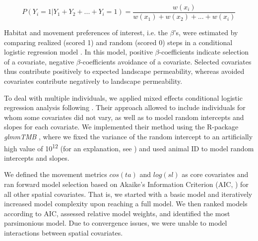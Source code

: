 \documentclass[abstract=on,10pt,a4paper,bibliography=totocnumbered]{scrartcl}
\begin{document}
\begin{equation}
\label{EQ3}
  P(Y_{i} = 1 | Y_{1} + Y_{2} + ... + Y_{i} = 1) =
  \frac{w(x_{i})}{w(x_{1}) + w(x_{2}) + ... + w(x_{i})}
\end{equation}

\noindent Habitat and movement preferences of interest, i.e. the \(\beta\)'s,
were estimated by comparing realized (scored 1) and random (scored 0) steps in a
conditional logistic regression model \citep{Fortin.2005}. In this model,
positive \(\beta\)-coefficients indicate selection of a covariate, negative
\(\beta\)-coefficients avoidance of a covariate. Selected covariates thus
contribute positively to expected landscape permeability, whereas avoided
covariates contribute negatively to landscape permeability.

To deal with multiple individuals, we applied mixed effects conditional logistic
regression analysis following \cite{Muff.2019}. Their approach allowed to
include individuals for whom some covariates did not vary, as well as to model
random intercepts and slopes for each covariate. We implemented their method
using the R-package \textit{glmmTMB} \citep{Mollie.2017}, where we fixed the
variance of the random intercept to an artificially high value of
10\textsuperscript{12} (for an explanation, see \cite{Muff.2019}) and used
animal ID to model random intercepts and slopes.

We defined the movement metrics \(cos(ta)\) and \(log(sl)\) as core covariates
and ran forward model selection based on Akaike's Information Criterion (AIC,
\cite{Burnham.2002}) for all other spatial covariates. That is, we started with
a basic model and iteratively increased model complexity upon reaching a
full model. We then ranked models according to AIC, assessed relative model
weights, and identified the most parsimonious model. Due to convergence issues,
we were unable to model interactions between spatial covariates.
\end{document}
